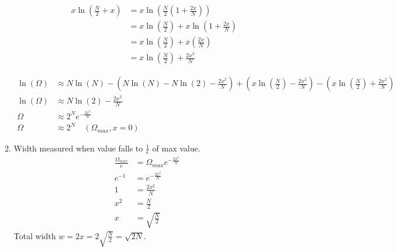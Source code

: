 \documentclass{article}
\begin{document}
\begin{enumerate}
\begin{enumerate}
\begin{enumerate}
\begin{align*}
                    x\ln\left( \frac{N}{2} + x \right) &= x\ln\left( \frac{N}{2} \left( 1 + \frac{2x}{N} \right) \right) \\
                    &= x\ln\left( \frac{N}{2} \right) + x\ln\left( 1 + \frac{2x}{N} \right) \\
                    &= x\ln\left( \frac{N}{2} \right) + x\left( \frac{2x}{N} \right) \\
                    &= x\ln\left( \frac{N}{2} \right) + \frac{2x^2}{N}
                \end{align*}
            \end{enumerate}
            \vspace{0.025in}
            \begin{align*}
                \ln(\Omega) &\approx N\ln(N) - \left( N\ln(N) - N\ln(2) - \frac{2x^2}{N} \right) + \left( x\ln\left( \frac{N}{2} \right) - \frac{2x^2}{N} \right) - \left( x\ln\left( \frac{N}{2} \right) + \frac{2x^2}{N} \right) \\
                \ln(\Omega) &\approx N\ln(2) - \frac{2x^2}{N} \\
                \Omega &\approx 2^N e^{-\frac{2x^2}{N}} \\
                \Omega &\approx 2^N \quad (\Omega_{max}, x = 0)
            \end{align*}
            \vspace{0.05in}
            \item
            Width measured when value falls to \(\frac{1}{e}\) of max value.
            \begin{align*}
                \frac{\Omega_{max}}{e} &= \Omega_{max} e^{-\frac{2x^2}{N}} \\
                e^{-1} &= e^{-\frac{2x^2}{N}} \\
                1 &= \frac{2x^2}{N} \\
                x^2 &= \frac{N}{2} \\
                x &= \sqrt{\frac{N}{2}}
            \end{align*}
            Total width \(w = 2x = 2\sqrt{\frac{N}{2}} = \sqrt{2N}\).
            \vspace{0.05in}

\end{enumerate}
\end{enumerate}
\end{document}
